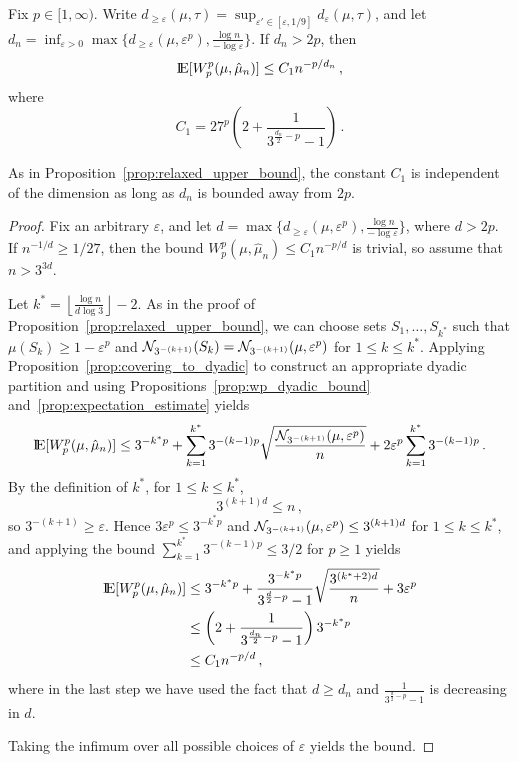 \documentclass[sts]{imsart}
\newcommand*{\ep}{\varepsilon}
\begin{document}
\begin{proposition}\label{prop:finite_sample}
Fix $p \in [1, \infty)$.
Write $d_{\geq \ep}(\mu, \tau) = \sup_{\ep' \in [\ep, 1/9]}d_{\ep}(\mu, \tau)$, and let $d_n = \inf_{\ep > 0} \max\{d_{\geq \ep}(\mu, \ep^p), \frac{\log n}{- \log \ep}\}$.
If $d_n > 2p$, then
\begin{equation*}
{\rm I}\kern-0.18em{\rm E}[W^p_p(\mu, \hat \mu_n)] \leq C_1 n^{-p/d_n}\,,
\end{equation*}
where
\begin{equation*}
C_1 = 27^p\left(2+\frac{1}{3^{\frac{d_n}{2} - p} -1}\right)\,.
\end{equation*}
\end{proposition}
As in Proposition~\ref{prop:relaxed_upper_bound}, the constant $C_1$ is independent of the dimension as long as $d_n$ is bounded away from $2 p$.
\begin{proof}
Fix an arbitrary $\ep$, and let $d = \max\{d_{\geq \ep}(\mu, \ep^p), \frac{\log n}{- \log \ep}\}$, where $d > 2p$.
If $n^{-1/d} \geq 1/27$, then the bound $W^p_p(\mu, \hat \mu_n) \leq C_1 n^{-p/d}$ is trivial, so assume that $n > 3^{3d}$.

Let $k^* = \left \lfloor \frac{\log n}{d \log 3} \right \rfloor - 2$.
As in the proof of Proposition~\ref{prop:relaxed_upper_bound}, we can choose sets $S_1, \dots, S_{k^*}$ such that $\mu(S_k) \geq 1 - \ep^p$ and $\cN_{3^{-(k+1)}}(S_k) = \cN_{3^{-(k+1)}}(\mu, \ep^p)$ for $1 \leq k \leq k^*$.
Applying Proposition~\ref{prop:covering_to_dyadic} to construct an appropriate dyadic partition and using Propositions~\ref{prop:wp_dyadic_bound} and~\ref{prop:expectation_estimate} yields
\begin{equation*}
\E[W_p^p(\mu, \hat \mu_n)] \leq 3^{- k^* p} + \sum_{k=1}^{k^*}3^{-(k-1)p}\sqrt{\frac{\cN_{3^{-(k+1)}}(\mu, \ep^p)}{n}} + 2 \ep^p \sum_{k=1}^{k^*} 3^{-(k-1)p}\,.
\end{equation*}
By the definition of $k^*$, for $1 \leq k \leq k^*$,
\begin{equation*}
3^{(k+1)d} \leq n\,,
\end{equation*}
so $3^{-(k + 1)} \geq \ep$.
Hence $3 \ep^p \leq 3^{-k^* p}$ and $\cN_{3^{-(k+1)}}(\mu, \ep^p) \leq 3^{(k+1)d}$ for $1 \leq k \leq k^*$, and applying the bound $\sum_{k=1}^{k^*} 3^{-(k-1)p} \leq 3/2$ for $p \geq 1$ yields
\begin{align*}
\E[W_p^p(\mu, \hat \mu_n)] & \leq 3^{-k^* p} + \frac{3^{-k^*p}}{3^{\frac{d}{2} - p} -1} \sqrt{\frac{3^{(k^* +2)d}}{n}} + 3\ep^p \\
& \leq \left(2+\frac{1}{3^{\frac{d_n}{2} - p} -1}\right) 3^{-k^* p} \\
& \leq C_1 n^{-p/d}\,,
\end{align*}
where in the last step we have used the fact that $d \geq d_n$ and $\frac{1}{3^{\frac{d}{2} - p} -1}$ is decreasing in $d$.

Taking the infimum over all possible choices of $\ep$ yields the bound.
\end{proof}
\end{document}
